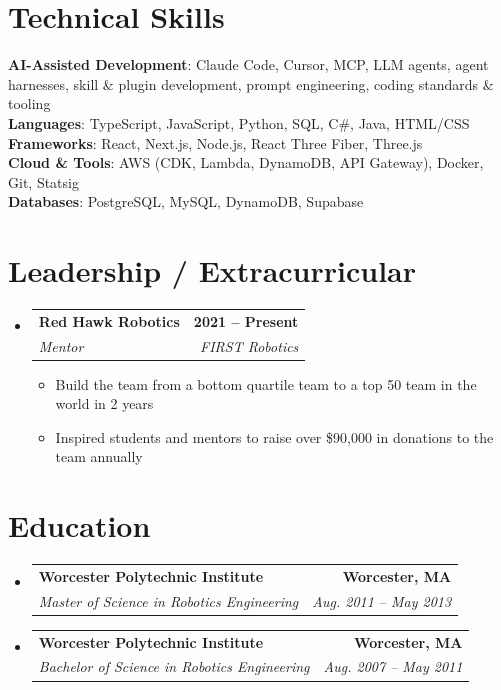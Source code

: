 \documentclass[letterpaper,11pt]{article}
\makeatletter
\newcommand{\resumeItem}[1]{
  \item\small{
    {#1 \vspace{-2pt}}
  }
}
\newcommand{\resumeSubheading}[4]{
  \vspace{-2pt}\item
    \begin{tabular*}{1.0\textwidth}[t]{l@{\extracolsep{\fill}}r}
      \textbf{#1} & \textbf{\small #2} \\
      \textit{\small#3} & \textit{\small #4} \\
    \end{tabular*}\vspace{-7pt}
}
\newcommand{\resumeSubHeadingListStart}{\begin{itemize}[leftmargin=0.0in, label={}]}
\newcommand{\resumeSubHeadingListEnd}{\end{itemize}}
\newcommand{\resumeItemListStart}{\begin{itemize}}
\newcommand{\resumeItemListEnd}{\end{itemize}\vspace{-5pt}}
\makeatother
\begin{document}
\section{Technical Skills}
 \begin{itemize}[leftmargin=0.15in, label={}]
    \small{\item{
     \textbf{AI-Assisted Development}{: Claude Code, Cursor, MCP, LLM agents, agent harnesses, skill \& plugin development, prompt engineering, coding standards \& tooling} \\
     \textbf{Languages}{: TypeScript, JavaScript, Python, SQL, C\#, Java, HTML/CSS} \\
     \textbf{Frameworks}{: React, Next.js, Node.js, React Three Fiber, Three.js} \\
     \textbf{Cloud \& Tools}{: AWS (CDK, Lambda, DynamoDB, API Gateway), Docker, Git, Statsig} \\
     \textbf{Databases}{: PostgreSQL, MySQL, DynamoDB, Supabase}
    }}
 \end{itemize}
 \vspace{-16pt}

\section{Leadership / Extracurricular}
    \resumeSubHeadingListStart
        \resumeSubheading{Red Hawk Robotics}{2021 -- Present}{Mentor}{FIRST Robotics}
            \resumeItemListStart
                \resumeItem{Build the team from a bottom quartile team to a top 50 team in the world in 2 years}
                \resumeItem{Inspired students and mentors to raise over \$90,000 in donations to the team annually}
            \resumeItemListEnd

    \resumeSubHeadingListEnd

\section{Education}
  \resumeSubHeadingListStart
    \resumeSubheading
      {Worcester Polytechnic Institute}{Worcester, MA}
      {Master of Science in Robotics Engineering}{Aug. 2011 -- May 2013}
    \resumeSubheading
    {Worcester Polytechnic Institute}{Worcester, MA}
    {Bachelor of Science in Robotics Engineering}{Aug. 2007 -- May 2011}
  \resumeSubHeadingListEnd
\end{document}
